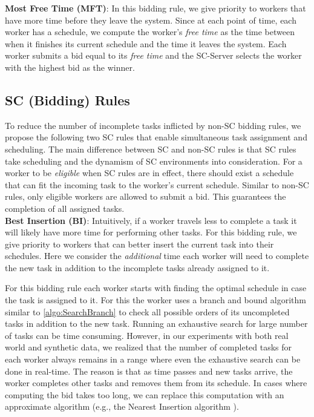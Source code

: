 \vspace{0.1in}
\noindent\textbf{Most Free Time (MFT)}:
In this bidding rule, we give priority to workers that have more time before they leave the system. Since at each point of time, each worker has a schedule, we compute the worker's \emph{free time} as the time between when it finishes its current schedule and the time it leaves the system. Each worker submits a bid equal to its \emph{free time} and the SC-Server selects the worker with the highest bid as the winner.

\subsection{SC (Bidding) Rules }

To reduce the number of incomplete tasks inflicted by non-SC bidding rules, we propose the following two SC rules that enable simultaneous task assignment and scheduling. The main difference between SC and non-SC rules is that SC rules take scheduling and the dynamism of SC environments into consideration. For a worker to be \emph{eligible} when SC rules are in effect, there should exist a schedule that can fit the incoming task to the worker's current schedule. Similar to non-SC rules, only eligible workers are allowed to submit a bid. This guarantees the completion of all assigned tasks.\\

\noindent \textbf{Best Insertion (BI)}: 
Intuitively, if a worker travels less to complete a task it will likely have more time for performing other tasks. For this bidding rule, we give priority to workers that can better insert the current task into their schedules. Here we consider the \textit{additional} time each worker will need to complete the new task in addition to the incomplete tasks already assigned to it.

For this bidding rule each worker starts with finding the optimal schedule in case the task is assigned to it. For this the worker uses a branch and bound algorithm similar to \cref{algo:SearchBranch} to check all possible orders of its uncompleted tasks in addition to the new task. Running an exhaustive search for large number of tasks can be time consuming. However, in our experiments with both real world and synthetic data, we realized that the number of completed tasks for each worker always remains in a range where even the exhaustive search can be done in real-time. The reason is that as time passes and new tasks arrive, the worker completes other tasks and removes them from its schedule. In cases where computing the bid takes too long, we can replace this computation with an approximate algorithm (e.g., the Nearest Insertion algorithm \cite{Rosenkrantz74}).

